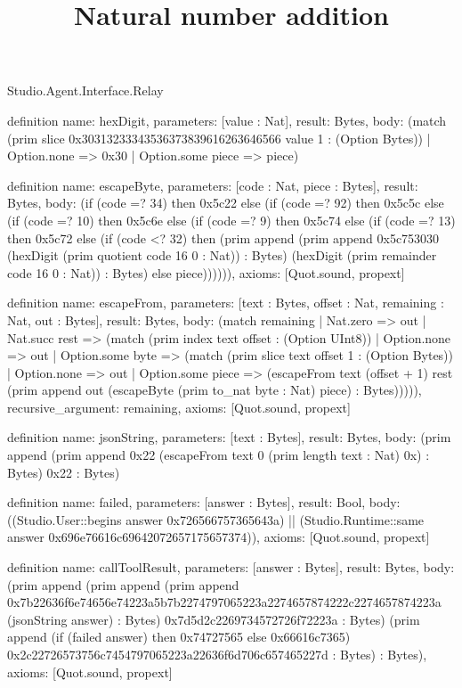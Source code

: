 \begin{lexlean}{Studio.Agent.Interface.Relay}
\title{Natural number addition}
\begin{semanticmodule}
definition{
  name: hexDigit,
  parameters: [value : Nat],
  result: Bytes,
  body: (match (prim slice 0x30313233343536373839616263646566 value 1 : (Option Bytes))
    | Option.none => 0x30
    | Option.some piece => piece)
}

definition{
  name: escapeByte,
  parameters: [code : Nat, piece : Bytes],
  result: Bytes,
  body: (if (code =? 34) then 0x5c22 else (if (code =? 92) then 0x5c5c else (if (code =? 10) then 0x5c6e else (if (code =? 9) then 0x5c74 else (if (code =? 13) then 0x5c72 else (if (code <? 32) then (prim append (prim append 0x5c753030 (hexDigit (prim quotient code 16 0 : Nat)) : Bytes) (hexDigit (prim remainder code 16 0 : Nat)) : Bytes) else piece)))))),
  axioms: [Quot.sound, propext]
}

definition{
  name: escapeFrom,
  parameters: [text : Bytes, offset : Nat, remaining : Nat, out : Bytes],
  result: Bytes,
  body: (match remaining
    | Nat.zero => out
    | Nat.succ rest => (match (prim index text offset : (Option UInt8))
      | Option.none => out
      | Option.some byte => (match (prim slice text offset 1 : (Option Bytes))
        | Option.none => out
        | Option.some piece => (escapeFrom text (offset + 1) rest (prim append out (escapeByte (prim to_nat byte : Nat) piece) : Bytes))))),
  recursive_argument: remaining,
  axioms: [Quot.sound, propext]
}

definition{
  name: jsonString,
  parameters: [text : Bytes],
  result: Bytes,
  body: (prim append (prim append 0x22 (escapeFrom text 0 (prim length text : Nat) 0x) : Bytes) 0x22 : Bytes)
}

definition{
  name: failed,
  parameters: [answer : Bytes],
  result: Bool,
  body: ((Studio.User::begins answer 0x726566757365643a) || (Studio.Runtime::same answer 0x696e76616c69642072657175657374)),
  axioms: [Quot.sound, propext]
}

definition{
  name: callToolResult,
  parameters: [answer : Bytes],
  result: Bytes,
  body: (prim append (prim append (prim append 0x7b22636f6e74656e74223a5b7b2274797065223a2274657874222c2274657874223a (jsonString answer) : Bytes) 0x7d5d2c2269734572726f72223a : Bytes) (prim append (if (failed answer) then 0x74727565 else 0x66616c7365) 0x2c22726573756c7454797065223a22636f6d706c657465227d : Bytes) : Bytes),
  axioms: [Quot.sound, propext]
}


\end{semanticmodule}
\end{lexlean}
